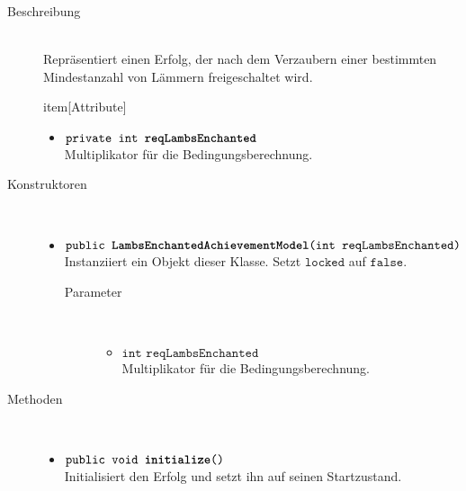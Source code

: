 \begin{description}
\item[Beschreibung] \hfill \\ Repräsentiert einen Erfolg, der nach dem Verzaubern einer bestimmten Mindestanzahl von Lämmern freigeschaltet wird.

item[Attribute] \hfill \\
	\vspace{-.8cm}
	\begin{itemize}
		\item $\texttt{private int \textbf{reqLambsEnchanted}}$ \\ Multiplikator für die Bedingungsberechnung.
	\end{itemize}

\item[Konstruktoren] \hfill \\
	\vspace{-.8cm}
	\begin{itemize}
		\item $\texttt{public \textbf{LambsEnchantedAchievementModel}(int reqLambsEnchanted)}$ \\ Instanziiert ein Objekt dieser Klasse. Setzt $\texttt{locked}$ auf $\texttt{false}$.
		\begin{description}
			\item[Parameter] \hfill \\
			\vspace{-.8cm}
			\begin{itemize}
				\item $\texttt{int reqLambsEnchanted}$ \\ Multiplikator für die Bedingungsberechnung.
			\end{itemize}
		\end{description}
	\end{itemize}
	
\item[Methoden] \hfill \\
	\vspace{-.8cm}
	\begin{itemize}
				\item $\texttt{public void \textbf{initialize}()}$ \\ Initialisiert den Erfolg und setzt ihn auf seinen Startzustand.
		

\end{itemize}
\end{description}
